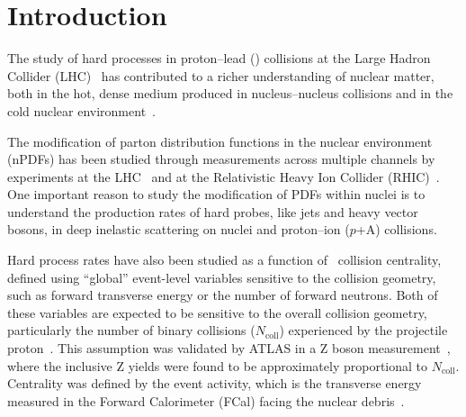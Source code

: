 \documentclass[PAPER, atlasdraft=false, USenglish, cernpreprint]{atlasdoc}
\begin{document}
\maketitle

\tableofcontents



\section{Introduction}
The study of hard processes in proton--lead (\pxPb) collisions at the Large Hadron Collider (LHC)~\cite{Evans:2008zzb} has contributed to a richer understanding of nuclear matter, both in the hot, dense medium produced in nucleus--nucleus collisions and in the cold nuclear environment~\cite{Nagle:2018nvi, Albacete:2017qng}.

The modification of parton distribution functions in the nuclear environment (nPDFs) \cite{Ethier:2020way, Klasen:2023uqj} has been studied through measurements across multiple channels by experiments at the LHC~\cite{CMS-HIN-13-007, HION-2013-09,CMS-HIN-13-001,CMS-HIN-14-001, HION-2022-15-Published,TOPQ-2023-32,CMS-HIN-17-002, LHCb:2017yua} and at the Relativistic Heavy Ion Collider (RHIC)~\cite{PHENIX-NPDF1,PHENIX-NPDDF2,STAR-NPDF1,STAR-NPDF2}.
One important reason to study the modification of PDFs within nuclei is to understand the production rates of hard probes, like jets and heavy vector bosons, in deep inelastic scattering on nuclei and proton--ion ($p$+A) collisions. 
 


Hard process rates have also been studied as a function of \pxPb\ collision centrality, defined using ``global'' event-level variables sensitive to the collision geometry, such as forward transverse energy or the number of forward neutrons.
Both of these variables are expected to be sensitive to the overall collision geometry, particularly the number of binary collisions ($N_{\mathrm{coll}}$) 
experienced by the projectile proton~\cite{ALICE:2014xsp}.
This assumption was validated by ATLAS in a Z boson measurement~\cite{HION-2013-09}, where the inclusive Z yields were found to be approximately proportional to $N_{\mathrm{coll}}$. Centrality was defined by the event activity, which is the transverse energy measured in the Forward Calorimeter (FCal) facing the nuclear debris~\cite{HION-2012-13}.
\end{document}
